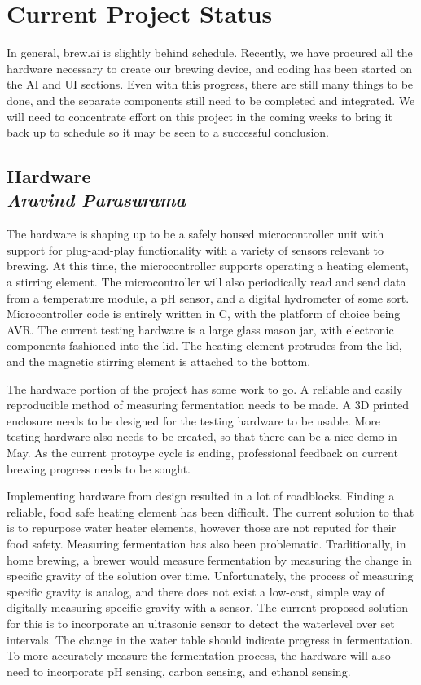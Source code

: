 \documentclass[draftclsnofoot,onecolumn,letterpaper,10pt]{IEEEtran}
\begin{document}
\section{Current Project Status}
In general, brew.ai is slightly behind schedule. Recently, we have procured all the hardware necessary to create our brewing device, and coding has been started on the AI and UI sections. Even with this progress, there are still many things to be done, and the separate components still need to be completed and integrated.
We will need to concentrate effort on this project in the coming weeks to bring it back up to schedule so it may be seen to a successful conclusion.

\subsection{Hardware\\{\em\textbf{Aravind Parasurama}}}
The hardware is shaping up to be a safely housed microcontroller unit with support
for plug-and-play functionality with a variety of sensors relevant to brewing.
At this time, the microcontroller supports operating a heating element, a stirring
element.
The microcontroller will also periodically read and send data from a temperature
module, a pH sensor, and a digital hydrometer of some sort.
Microcontroller code is entirely written in C, with the platform of choice being
AVR.
The current testing hardware is a large glass mason jar, with electronic components
fashioned into the lid.
The heating element protrudes from the lid, and the magnetic stirring element
is attached to the bottom.

The hardware portion of the project has some work to go.
A reliable and easily reproducible method of measuring fermentation needs to be made.
A 3D printed enclosure needs to be designed for the testing hardware to be usable.
More testing hardware also needs to be created, so that there can be a nice demo in May.
As the current protoype cycle is ending, professional feedback on current brewing progress
needs to be sought.

Implementing hardware from design resulted in a lot of roadblocks.
Finding a reliable, food safe heating element has been difficult.
The current solution to that is to repurpose water heater elements, however those
are not reputed for their food safety.
Measuring fermentation has also been problematic.
Traditionally, in home brewing, a brewer would measure fermentation by measuring
the change in specific gravity of the solution over time.
Unfortunately, the process of measuring specific gravity is analog, and there does
not exist a low-cost, simple way of digitally measuring specific gravity with a
sensor.
The current proposed solution for this is to incorporate an ultrasonic sensor to
detect the waterlevel over set intervals.
The change in the water table should indicate progress in fermentation.
To more accurately measure the fermentation process, the hardware will also need
to incorporate pH sensing, carbon sensing, and ethanol sensing.
\end{document}
